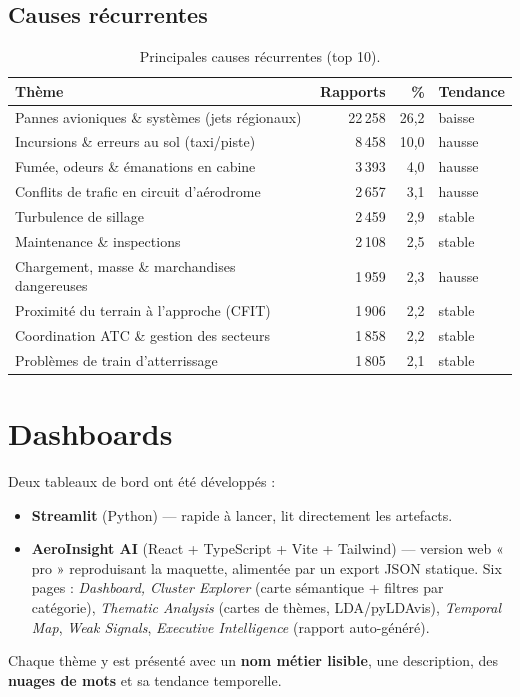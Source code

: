 \documentclass[11pt,a4paper]{article}
\begin{document}
\subsection{Causes récurrentes}
\begin{table}[h]\centering\small
\caption{Principales causes récurrentes (top 10).}\label{tab:causes}
\begin{tabular}{p{6.4cm}rrl}
\toprule
\textbf{Thème} & \textbf{Rapports} & \textbf{\%} & \textbf{Tendance} \\
\midrule
Pannes avioniques \& systèmes (jets régionaux) & 22\,258 & 26,2 & baisse \\
Incursions \& erreurs au sol (taxi/piste) & 8\,458 & 10,0 & hausse \\
Fumée, odeurs \& émanations en cabine & 3\,393 & 4,0 & hausse \\
Conflits de trafic en circuit d'aérodrome & 2\,657 & 3,1 & hausse \\
Turbulence de sillage & 2\,459 & 2,9 & stable \\
Maintenance \& inspections & 2\,108 & 2,5 & stable \\
Chargement, masse \& marchandises dangereuses & 1\,959 & 2,3 & hausse \\
Proximité du terrain à l'approche (CFIT) & 1\,906 & 2,2 & stable \\
Coordination ATC \& gestion des secteurs & 1\,858 & 2,2 & stable \\
Problèmes de train d'atterrissage & 1\,805 & 2,1 & stable \\
\bottomrule
\end{tabular}
\end{table}

\section{Dashboards}
Deux tableaux de bord ont été développés :
\begin{itemize}[leftmargin=1.4em,nosep]
  \item \textbf{Streamlit} (Python) — rapide à lancer, lit directement les artefacts.
  \item \textbf{AeroInsight AI} (React + TypeScript + Vite + Tailwind) — version web « pro »
  reproduisant la maquette, alimentée par un export JSON statique. Six pages :
  \emph{Dashboard, Cluster Explorer} (carte sémantique + filtres par catégorie),
  \emph{Thematic Analysis} (cartes de thèmes, LDA/pyLDAvis), \emph{Temporal Map},
  \emph{Weak Signals}, \emph{Executive Intelligence} (rapport auto-généré).
\end{itemize}
Chaque thème y est présenté avec un \textbf{nom métier lisible}, une description, des
\textbf{nuages de mots} et sa tendance temporelle.
\end{document}
